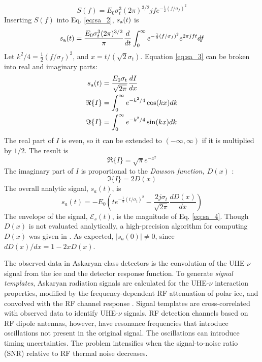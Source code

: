 \documentclass[amsmath,amssymb,aps,prd,10pt,twocolumn,showkeys]{revtex4}
\begin{document}
\begin{equation}
S(f) = E_0 \sigma_t^3 (2\pi)^{3/2} j f e^{-\frac{1}{2}\left(f/\sigma_f\right)^2} \label{eq:spec}
\end{equation}
Inserting $S(f)$ into Eq. \ref{eq:sa_2}, $s_{\rm a}(t)$ is
\begin{equation}
s_{\rm a}(t) = \frac{E_0 \sigma_t^3 (2\pi)^{3/2}}{\pi} \frac{d}{dt}\int_0^{\infty} e^{-\frac{1}{2}\left(f/\sigma_f\right)^2} e^{2\pi j f t} df \label{eq:sa_3}
\end{equation}
 Let $k^2/4 = \frac{1}{2}\left(f/\sigma_f\right)^2$, and $x = t/(\sqrt{2}\sigma_t)$.  Equation \ref{eq:sa_3} can be broken into real and imaginary parts:
\begin{align}
s_{\rm a}(t) &= \frac{E_0 \sigma_{\rm t}}{\sqrt{2\pi}}\frac{dI}{dx} \\
\Re\lbrace I \rbrace &= \int_0^{\infty} e^{-k^2/4}\cos(kx) dk \\
\Im\lbrace I \rbrace &= \int_0^{\infty} e^{-k^2/4}\sin(kx) dk
\end{align}
The real part of $I$ is even, so it can be extended to $(-\infty,\infty)$ if it is multiplied by $1/2$.  The result is
\begin{equation}
\Re\lbrace I \rbrace = \sqrt{\pi} e^{-x^2}
\end{equation}
The imaginary part of $I$ is proportional to the \textit{Dawson function, $D(x)$} \cite{NIST:DLMF}:
\begin{equation}
\Im\lbrace I\rbrace = 2 D(x)
\end{equation}
 The overall analytic signal, $s_a(t)$, is
\begin{equation}
s_a(t) = -E_0 \left(t e^{-\frac{1}{2}\left(t/\sigma_t\right)^2} - \frac{2 j\sigma_t}{\sqrt{2\pi}} \frac{dD(x)}{dx}\right) \label{eq:sa_4}
\end{equation}
The envelope of the signal, $\mathcal{E}_s(t)$, is the magnitude of Eq. \ref{eq:sa_4}.  Though $D(x)$ is not evaluated analytically, a high-precision algorithm for computing $D(x)$ was given in \cite{10.1063/1.4822832}.  As expected, $|s_a(0)| \neq 0$, since $dD(x)/dx = 1 - 2x D(x)$.

The observed data in Askaryan-class detectors is the convolution of the UHE-$\nu$ signal from the ice and the detector response function.  To generate \textit{signal templates}, Askaryan radiation signals are calculated for the UHE-$\nu$ interaction properties, modified by the frequency-dependent RF attenuation of polar ice, and convolved with the RF channel response \cite{10.1016/j.astropartphys.2014.09.002,10.3189/2015jog14j214}.  Signal templates are cross-correlated with observed data to identify UHE-$\nu$ signals.  RF detection channels based on RF dipole antennas, however, have resonance frequencies that introduce oscillations not present in the original signal.  The oscillations can introduce timing uncertainties.  The problem intensifies when the signal-to-noise ratio (SNR) relative to RF thermal noise decreases.
\end{document}
